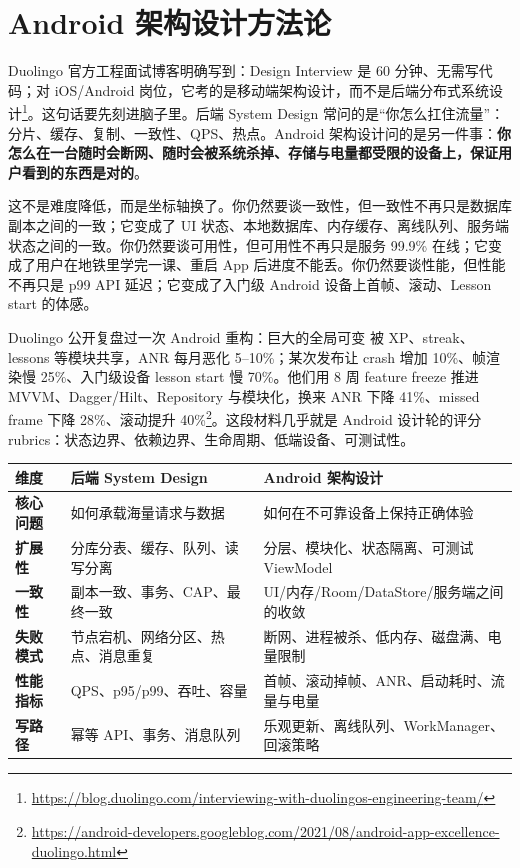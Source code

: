 \chapter{Android 架构设计方法论}

\srcofficial Duolingo 官方工程面试博客明确写到：Design Interview 是 60 分钟、无需写代码；对 iOS/Android 岗位，它考的是移动端架构设计，而不是后端分布式系统设计\footnote{\url{https://blog.duolingo.com/interviewing-with-duolingos-engineering-team/}}。这句话要先刻进脑子里。后端 System Design 常问的是“你怎么扛住流量”：分片、缓存、复制、一致性、QPS、热点。Android 架构设计问的是另一件事：\textbf{你怎么在一台随时会断网、随时会被系统杀掉、存储与电量都受限的设备上，保证用户看到的东西是对的}。

这不是难度降低，而是坐标轴换了。你仍然要谈一致性，但一致性不再只是数据库副本之间的一致；它变成了 UI 状态、本地数据库、内存缓存、离线队列、服务端状态之间的一致。你仍然要谈可用性，但可用性不再只是服务 99.9\% 在线；它变成了用户在地铁里学完一课、重启 App 后进度不能丢。你仍然要谈性能，但性能不再只是 p99 API 延迟；它变成了入门级 Android 设备上首帧、滚动、Lesson start 的体感。

\srcofficial Duolingo 公开复盘过一次 Android 重构：巨大的全局可变  被 XP、streak、lessons 等模块共享，ANR 每月恶化 5--10\%；某次发布让 crash 增加 10\%、帧渲染慢 25\%、入门级设备 lesson start 慢 70\%。他们用 8 周 feature freeze 推进 MVVM、Dagger/Hilt、Repository 与模块化，换来 ANR 下降 41\%、missed frame 下降 28\%、滚动提升 40\%\footnote{\url{https://android-developers.googleblog.com/2021/08/android-app-excellence-duolingo.html}}。这段材料几乎就是 Android 设计轮的评分 rubrics：状态边界、依赖边界、生命周期、低端设备、可测试性。

\begin{center}
\begin{tabularx}{\textwidth}{>{\bfseries}p{} X X}
\toprule
维度 & 后端 System Design & Android 架构设计 \\
\midrule
核心问题 & 如何承载海量请求与数据 & 如何在不可靠设备上保持正确体验 \\
扩展性 & 分库分表、缓存、队列、读写分离 & 分层、模块化、状态隔离、可测试 ViewModel \\
一致性 & 副本一致、事务、CAP、最终一致 & UI/内存/Room/DataStore/服务端之间的收敛 \\
失败模式 & 节点宕机、网络分区、热点、消息重复 & 断网、进程被杀、低内存、磁盘满、电量限制 \\
性能指标 & QPS、p95/p99、吞吐、容量 & 首帧、滚动掉帧、ANR、启动耗时、流量与电量 \\
写路径 & 幂等 API、事务、消息队列 & 乐观更新、离线队列、WorkManager、回滚策略 \\
\bottomrule
\end{tabularx}
\end{center}

